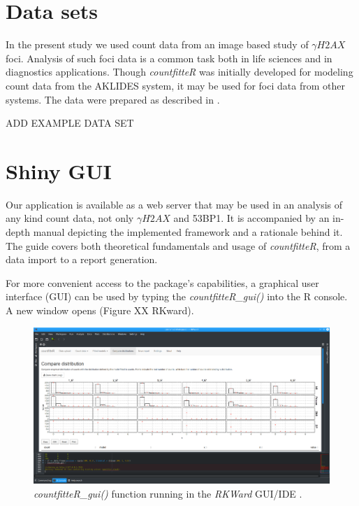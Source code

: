 \section{Data sets}
In the present study we used count data from an image based study of $\gamma H2AX$ foci. Analysis of such foci data is a common task both in life sciences and in diagnostics applications. Though \emph{countfitteR} was initially developed for modeling count data from the AKLIDES system, it may be used for foci data from other systems.
The data were prepared as described in \citep{rodiger_quantification_2018}.

ADD EXAMPLE DATA SET

\section{Shiny GUI} %

Our application is available as a web server that may be used in an analysis of any kind count data, not only $\gamma H2AX$ and 53BP1. It is accompanied by an in-depth manual depicting the implemented framework and a rationale behind it. The guide covers both theoretical fundamentals and usage of \emph{countfitteR}, from a data import to a report generation.

For more convenient access to the package’s capabilities, a graphical user interface (GUI) can be used by typing the \emph{countfitteR\_gui()} into the R console. A new window opens (Figure XX RKward). 

\begin{figure}[htbp]
  \centering
  \includegraphics[width=0.99\columnwidth]{fig_gui}
  \caption{\emph{countfitteR\_gui()} function running in the \emph{RKWard} GUI/IDE \citep{rodiger_rkward:_2012}.}
  \label{figure:fig_gui.png}
\end{figure}

